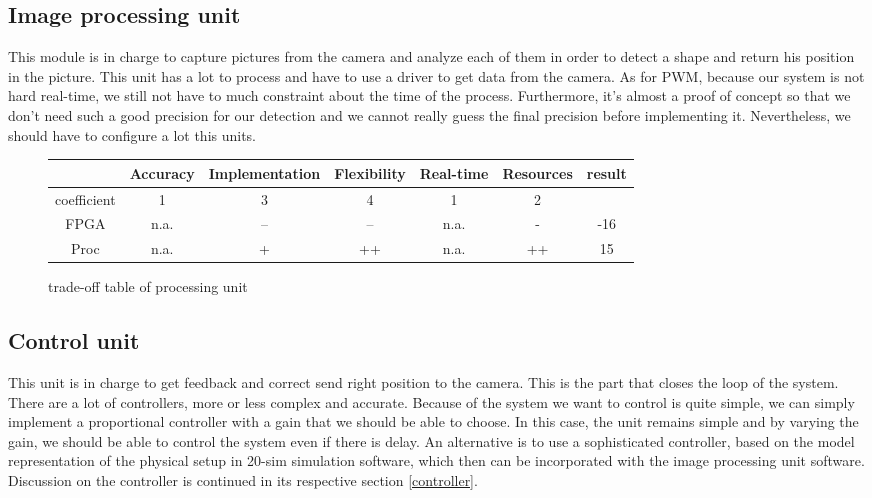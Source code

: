 \subsection{Image processing unit}

This module is in charge to capture pictures from the camera and analyze each of them in order to detect a shape and return his position in the picture. This unit has a lot to process and have to use a driver to get data from the camera. As for PWM, because our system is not hard real-time, we still not have to much constraint about the time of the process. Furthermore, it's almost a proof of concept so that we don't need  such a good precision for our detection and we cannot really guess the final precision before implementing it. Nevertheless, we should have to configure a lot this units.

\begin{figure}[!ht]
\hspace{-1cm}
\begin{tabular}{|c|c|c|c|c|c|c|}\hline
                         & Accuracy  & Implementation & Flexibility & Real-time & Resources & result \\\hline
coefficient   &         1          &           3                      &         4           &           1         &         2               &             \\\hline
FPGA            &      n.a.        &            --                   &         --          &        n.a.       &         -              &      -16  \\\hline
Proc               &      n.a.         &            +                   &         ++        &         n.a.      &          ++          &       15    \\\hline
\end{tabular}
\caption{trade-off table of processing unit}
\end{figure}

\subsection{Control unit}

This unit is in charge to get feedback and correct send right position to the camera. This is the part that closes the loop of the system. There are a lot of controllers, more or less complex and accurate. Because of the system we want to control is quite simple, we can simply implement a proportional controller with a gain that we should be able to choose. In this case, the unit remains simple and by varying the gain, we should be able to control the system even if there is delay. An alternative is to use a sophisticated controller, based on the model representation of the physical setup in 20-sim simulation software, which then can be incorporated with the image processing unit software. Discussion on the controller is continued in its respective section \ref{controller}.

